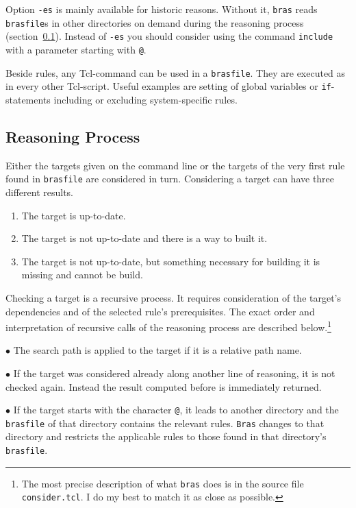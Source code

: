\documentclass[12pt]{article}
\newcommand{\bras}{\texttt{bras}}
\newcommand{\Bras}{\texttt{Bras}}
\begin{document}
Option \texttt{-es} is mainly available for historic reasons. Without
it, \bras{} reads \texttt{brasfile}s in other directories on demand
during the reasoning process (section~\ref{secReasoning}). Instead of
\texttt{-es} you should consider using the command \texttt{include}
with a parameter starting with \texttt{@}.

Beside rules, any Tcl-command can be used in a \texttt{brasfile}. They
are executed as in every other Tcl-script. Useful examples are setting
of global variables or \texttt{if}-statements including or excluding
system-specific rules.

\subsection{Reasoning Process}
\label{secReasoning}
Either the targets given on the command line or the targets of the
very first rule found in \texttt{brasfile} are considered in
turn. Considering a target can have three different results. 
\begin{enumerate}
\item
The target is up-to-date.
\item
The target is not up-to-date and there is a way to built it.
\item
The target is not up-to-date, but something necessary for building it
is missing and cannot be build.
\end{enumerate}
Checking a target is a recursive process. It requires consideration of
the target's dependencies and of the selected rule's
prerequisites. The exact order and interpretation of recursive calls
of the reasoning process are described below.\footnote{The most
precise description of what \bras{} does is in the
source file \texttt{consider.tcl}. I do my best to match it as close
as possible.}

$\bullet$ The search path is applied to the target if it is a relative
path name.

$\bullet$ If the target was considered already along another line of
reasoning, it is not checked again. Instead the result computed before
is immediately returned.

$\bullet$ If the target starts with the character \texttt{@}, it leads
to another directory and the \texttt{brasfile} of that directory
contains the relevant rules. \Bras{} changes to that
directory and restricts the applicable rules to those found in that
directory's \texttt{brasfile}.
\end{document}
